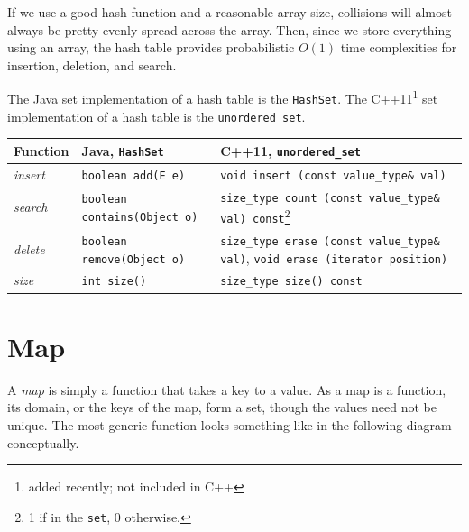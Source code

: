 If we use a good hash function and a reasonable array size, collisions will almost always be pretty evenly spread across the array. Then, since we store everything using an array, the hash table provides probabilistic $O(1)$ time complexities for insertion, deletion, and search.

The Java set implementation of a hash table is the \texttt{HashSet}. The C++11\footnote{added recently; not included in C++} set implementation of a hash table is the \texttt{unordered\_set}.

\begin{center}\begin{tabular}{ | p{5cm} | p{5cm} | p{5cm} | }
      \hline
      \textbf{Function}	&	\textbf{Java, \texttt{HashSet}}	&	\textbf{C++11, \texttt{unordered\_set}} \\ \hline
      \textit{insert}		&	\texttt{boolean add(E e)}	&	\texttt{void insert (const value\_type\& val)} \\ \hline
      \textit{search}		&	\texttt{boolean contains(Object o)}	&	\texttt{size\_type count (const value\_type\& val) const}\footnote{1 if in the \texttt{set}, 0 otherwise.}	\\ \hline
      \textit{delete}		&	\texttt{boolean	remove(Object o)}		&	\texttt{size\_type erase (const value\_type\& val)}, \texttt{void erase (iterator position)} \\ \hline
      \textit{size} & \texttt{int size()} & \texttt{size\_type size() const} \\ \hline
\end{tabular}\end{center}

\section{Map}

A \textit{map} is simply a function that takes a key to a value. As a map is a function, its domain, or the keys of the map, form a set, though the values need not be unique. The most generic function looks something like in the following diagram conceptually.

